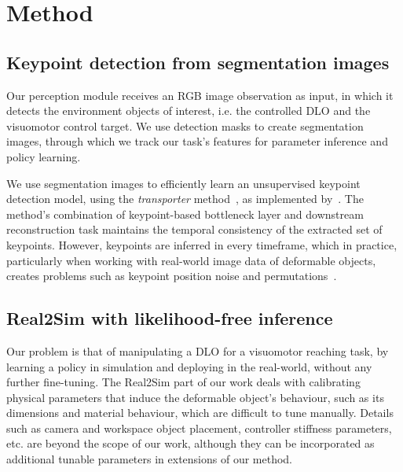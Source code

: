 \section{Method}
\label{sec:method}

\subsection{Keypoint detection from segmentation images}
\label{subsec:real2sim2real-seg-img-n-kps}

Our perception module receives an RGB image observation as input, in which it detects the environment objects of interest, i.e. the controlled DLO and the visuomotor control target. We use detection masks to create segmentation images, through which we track our task's features for parameter inference and policy learning.

We use segmentation images to efficiently learn an unsupervised keypoint detection model, using the \emph{transporter} method~\cite{kulkarni2019unsupervised}, as implemented by~\cite{li2020causal}.
The method's combination of keypoint-based bottleneck layer and downstream reconstruction task maintains the temporal consistency of the extracted set of keypoints. However, keypoints are inferred in every timeframe, which in practice, particularly when working with real-world image data of deformable objects, creates problems such as keypoint position noise and permutations~\cite{antonova2022bayesian}.

\subsection{Real2Sim with likelihood-free inference}
\label{subsec:real2sim-bayessim}

Our problem is that of manipulating a DLO for a visuomotor reaching task, by learning a policy in simulation and deploying in the real-world, without any further fine-tuning. The Real2Sim part of our work deals with calibrating physical parameters that induce the deformable object's behaviour, such as its dimensions and material behaviour, which are difficult to tune manually. Details such as camera and workspace object placement, controller stiffness parameters, etc. are beyond the scope of our work, although they can be incorporated as additional tunable parameters in extensions of our method.

